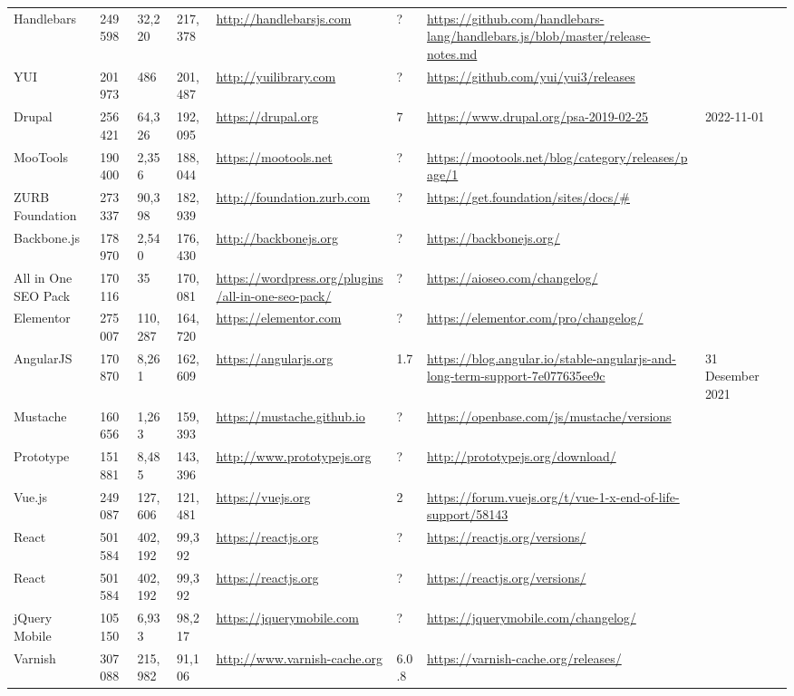\begin{table}[!htp]
\begin{tabular}{|l|l|l|l|l|l|l|l|l|}
				Handlebars &249598 &32,220 &217,378 &\ul{http://handlebarsjs.com} &? &\ul{https://github.com/handlebars-lang/handlebars.js/blob/master/release-notes.md} & \\
				YUI &201973 &486 &201,487 &\ul{http://yuilibrary.com} &? &\ul{https://github.com/yui/yui3/releases} & \\
				Drupal &256421 &64,326 &192,095 &\ul{https://drupal.org} &7 &\ul{https://www.drupal.org/psa-2019-02-25} &2022-11-01 \\
				MooTools &190400 &2,356 &188,044 &\ul{https://mootools.net} &? &\ul{https://mootools.net/blog/category/releases/page/1} & \\
				ZURB Foundation &273337 &90,398 &182,939 &\ul{http://foundation.zurb.com} &? &\ul{https://get.foundation/sites/docs/\#} & \\
				Backbone.js &178970 &2,540 &176,430 &\ul{http://backbonejs.org} &? &\ul{https://backbonejs.org/} & \\
				All in One SEO Pack &170116 &35 &170,081 &\ul{https://wordpress.org/plugins/all-in-one-seo-pack/} &? &\ul{https://aioseo.com/changelog/} & \\
				Elementor &275007 &110,287 &164,720 &\ul{https://elementor.com} &? &\ul{https://elementor.com/pro/changelog/} & \\
				AngularJS &170870 &8,261 &162,609 &\ul{https://angularjs.org} &1.7 &\ul{https://blog.angular.io/stable-angularjs-and-long-term-support-7e077635ee9c} &31 Desember 2021 \\
				Mustache &160656 &1,263 &159,393 &\ul{https://mustache.github.io} &? &\ul{https://openbase.com/js/mustache/versions} & \\
				Prototype &151881 &8,485 &143,396 &\ul{http://www.prototypejs.org} &? &\ul{http://prototypejs.org/download/} & \\
				Vue.js &249087 &127,606 &121,481 &\ul{https://vuejs.org} &2 &\ul{https://forum.vuejs.org/t/vue-1-x-end-of-life-support/58143} & \\
				React &501584 &402,192 &99,392 &\ul{https://reactjs.org} &? &\ul{https://reactjs.org/versions/} & \\
				React &501584 &402,192 &99,392 &\ul{https://reactjs.org} &? &\ul{https://reactjs.org/versions/} & \\
				jQuery Mobile &105150 &6,933 &98,217 &\ul{https://jquerymobile.com} &? &\ul{https://jquerymobile.com/changelog/} & \\
				Varnish &307088 &215,982 &91,106 &\ul{http://www.varnish-cache.org} &6.0.8 &\ul{https://varnish-cache.org/releases/} & \\

\end{tabular}
\end{table}
